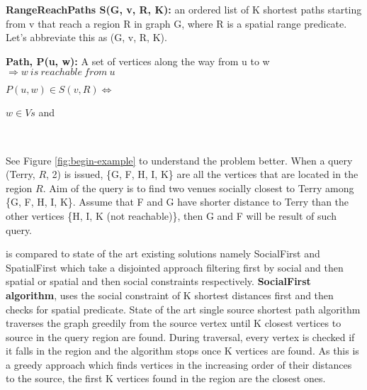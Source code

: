 \textbf{RangeReachPaths S(G, v, R, K):} an ordered list of K shortest paths starting from v that reach a region R in graph G, where R is a spatial range predicate. Let's abbreviate this as {\rrp}(G, v, R, K).

\textbf{Path, P(u, w):} A set of vertices along the way from u to w \(\Rightarrow w\ is\ reachable\ from\ u\)

\quad${P(u, w) \in S(v, R) \Leftrightarrow}$

\quad{}

\quad\quad${w \in Vs}$ and

\quad{}\\

\fi

See Figure \ref{fig:begin-example} to understand the problem better. When a query {\query}(Terry, $R$, 2) is issued, \{G, F, H, I, K\} are all the vertices that are located in the region $R$. Aim of the query is to find two venues socially closest to Terry among \{G, F, H, I, K\}. Assume that F and G have shorter distance to Terry than the other vertices \{H, I, K (not reachable)\}, then G and F will be result of such {\query} query.


{\rrp} is compared to state of the art existing solutions namely SocialFirst and SpatialFirst which take a disjointed approach filtering first by social and then spatial or spatial and then social constraints respectively. \textbf{SocialFirst algorithm}, uses the social constraint of K shortest distances first and then checks for spatial predicate. State of the art single source shortest path algorithm traverses the graph greedily from the source vertex until K closest vertices to source in the query region are found. During traversal, every vertex is checked if it falls in the region and the algorithm stops once K vertices are found. As this is a greedy approach which finds vertices in the increasing order of their distances to the source, the first K vertices found in the region are the closest ones.

